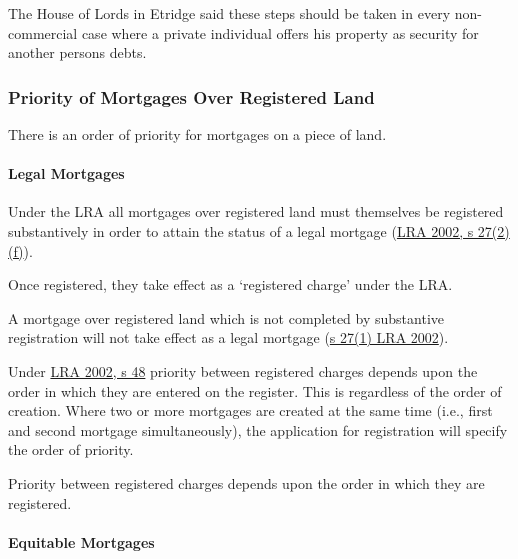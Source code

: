 \documentclass[
]{article}
\newenvironment{Shaded}{}{}
\newcommand{\NormalTok}[1]{#1}
\begin{document}
\begin{Shaded}
\begin{Highlighting}[]
\NormalTok{The House of Lords in Etridge said these steps should be taken in every non{-}commercial case where a private individual offers his property as security for another person\textquotesingle{}s debts.}
\end{Highlighting}
\end{Shaded}

\hypertarget{priority-of-mortgages-over-registered-land}{%
\subsubsection{Priority of Mortgages Over Registered
Land}\label{priority-of-mortgages-over-registered-land}}

There is an order of priority for mortgages on a piece of land.

\hypertarget{legal-mortgages-1}{%
\paragraph{Legal Mortgages}\label{legal-mortgages-1}}

Under the LRA all mortgages over registered land must themselves be
registered substantively in order to attain the status of a legal
mortgage
(\href{https://www.legislation.gov.uk/ukpga/2002/9/section/27}{LRA 2002,
s 27(2)(f)}).

Once registered, they take effect as a `registered charge' under the
LRA.

A mortgage over registered land which is not completed by substantive
registration will not take effect as a legal mortgage
(\href{https://www.legislation.gov.uk/ukpga/2002/9/section/27}{s 27(1)
LRA 2002}).

Under \href{https://www.legislation.gov.uk/ukpga/2002/9/section/48}{LRA
2002, s 48} priority between registered charges depends upon the order
in which they are entered on the register. This is regardless of the
order of creation. Where two or more mortgages are created at the same
time (i.e., first and second mortgage simultaneously), the application
for registration will specify the order of priority.

Priority between registered charges depends upon the order in which they
are registered.

\hypertarget{equitable-mortgages-1}{%
\paragraph{Equitable Mortgages}\label{equitable-mortgages-1}}
\end{document}

